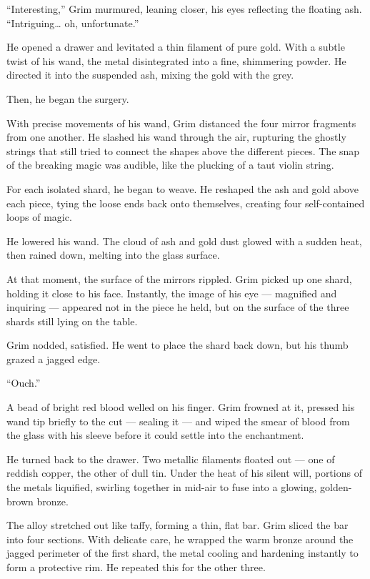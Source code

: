\enquote{Interesting,} Grim murmured, leaning closer, his eyes reflecting the floating ash. \enquote{Intriguing\ldots{} oh, unfortunate.}
 
He opened a drawer and levitated a thin filament of pure gold. With a subtle twist of his wand, the metal disintegrated into a fine, shimmering powder. He directed it into the suspended ash, mixing the gold with the grey.
 
Then, he began the surgery.
 
With precise movements of his wand, Grim distanced the four mirror fragments from one another. He slashed his wand through the air, rupturing the ghostly strings that still tried to connect the shapes above the different pieces. The snap of the breaking magic was audible, like the plucking of a taut violin string.
 
For each isolated shard, he began to weave. He reshaped the ash and gold above each piece, tying the loose ends back onto themselves, creating four self-contained loops of magic.
 
He lowered his wand. The cloud of ash and gold dust glowed with a sudden heat, then rained down, melting into the glass surface.
 
At that moment, the surface of the mirrors rippled. Grim picked up one shard, holding it close to his face. Instantly, the image of his eye --- magnified and inquiring --- appeared not in the piece he held, but on the surface of the three shards still lying on the table.
 
Grim nodded, satisfied. He went to place the shard back down, but his thumb grazed a jagged edge.
 
\enquote{Ouch.}
 
A bead of bright red blood welled on his finger. Grim frowned at it, pressed his wand tip briefly to the cut --- sealing it --- and wiped the smear of blood from the glass with his sleeve before it could settle into the enchantment.
 
He turned back to the drawer. Two metallic filaments floated out --- one of reddish copper, the other of dull tin. Under the heat of his silent will, portions of the metals liquified, swirling together in mid-air to fuse into a glowing, golden-brown bronze.
 
The alloy stretched out like taffy, forming a thin, flat bar. Grim sliced the bar into four sections. With delicate care, he wrapped the warm bronze around the jagged perimeter of the first shard, the metal cooling and hardening instantly to form a protective rim. He repeated this for the other three.
 
